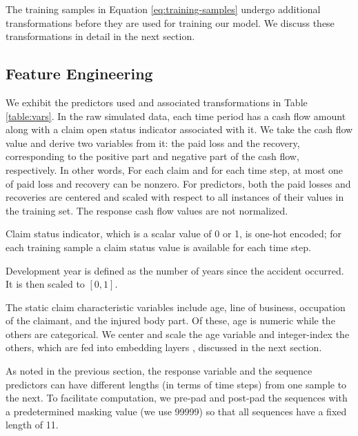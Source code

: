 \documentclass{article}
\begin{document}
The training samples in Equation \ref{eq:training-samples} undergo additional transformations before they are used for training our model. We discuss these transformations in detail in the next section.

\subsection{Feature Engineering} \label{sec:fe}

We exhibit the predictors used and associated transformations in Table \ref{table:vars}. In the raw simulated data, each time period has a cash flow amount along with a claim open status indicator associated with it. We take the cash flow value and derive two variables from it: the paid loss and the recovery, corresponding to the positive part and negative part of the cash flow, respectively. In other words, For each claim and for each time step, at most one of paid loss and recovery can be nonzero. For predictors, both the paid losses and recoveries are centered and scaled with respect to all instances of their values in the training set. The response cash flow values are not normalized.

Claim status indicator, which is a scalar value of 0 or 1, is one-hot encoded; for each training sample a claim status value is available for each time step.

Development year is defined as the number of years since the accident occurred. It is then scaled to $[0, 1]$.

The static claim characteristic variables include age, line of business, occupation of the claimant, and the injured body part. Of these, age is numeric while the others are categorical. We center and scale the age variable and integer-index the others, which are fed into embedding layers \cite{guo2016entity}, discussed in the next section.

As noted in the previous section, the response variable and the sequence predictors can have different lengths (in terms of time steps) from one sample to the next. To facilitate computation, we pre-pad and post-pad the sequences with a predetermined masking value (we use 99999) so that all sequences have a fixed length of 11.
\end{document}
